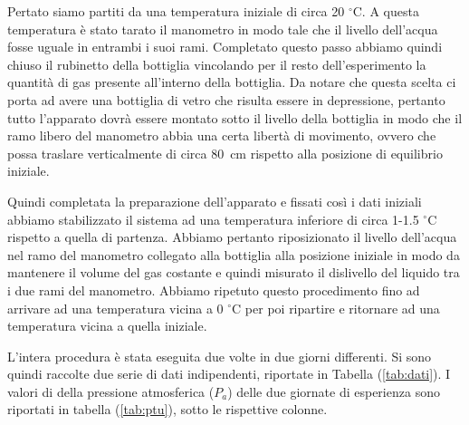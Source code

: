 Pertato siamo partiti da una temperatura iniziale di circa 20 $^\circ$C. A questa temperatura è stato tarato il manometro in modo tale che il livello dell'acqua fosse uguale in entrambi i suoi rami. Completato questo passo abbiamo quindi chiuso il rubinetto della bottiglia vincolando per il resto dell'esperimento la quantità di gas presente all'interno della bottiglia. Da notare che questa scelta ci porta ad avere una bottiglia di vetro che risulta essere in depressione, pertanto tutto l'apparato dovrà essere montato sotto il livello della bottiglia in modo che il ramo libero del manometro abbia una certa libertà di movimento, ovvero che possa traslare verticalmente di circa \SI{80}{\centi\metre} rispetto alla posizione di equilibrio iniziale.

Quindi completata la preparazione dell'apparato e fissati così i dati iniziali abbiamo stabilizzato il sistema ad una temperatura inferiore di circa 1-1.5 $^\circ$C rispetto a quella di partenza. Abbiamo pertanto riposizionato il livello dell'acqua nel ramo del manometro collegato alla bottiglia alla posizione iniziale in modo da mantenere il volume del gas costante e quindi misurato il dislivello del liquido tra i due rami del manometro.
Abbiamo ripetuto questo procedimento fino ad arrivare ad una temperatura vicina a 0 $^\circ$C per poi ripartire e ritornare ad una temperatura vicina a quella iniziale.

L'intera procedura è stata eseguita due volte in due giorni differenti. Si sono quindi raccolte due serie di dati indipendenti, riportate
in Tabella (\ref{tab:dati}). I valori di della pressione atmosferica ($P_a$) delle due giornate di esperienza sono
riportati in tabella (\ref{tab:ptu}), sotto le rispettive colonne.

